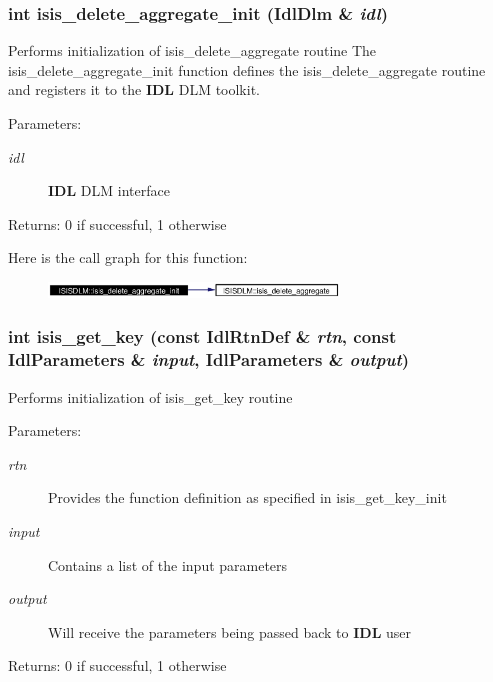 \subsubsection{\setlength{\rightskip}{0pt plus 5cm}int isis\_\-delete\_\-aggregate\_\-init (Idl\-Dlm \& {\em idl})}\label{namespaceISISDLM_a15}


Performs initialization of isis\_\-delete\_\-aggregate routine The isis\_\-delete\_\-aggregate\_\-init function defines the isis\_\-delete\_\-aggregate routine and registers it to the {\bf IDL} DLM toolkit. \begin{Desc}
\item[Parameters:]
\begin{description}
\item[{\em idl}]{\bf IDL} DLM interface \end{description}
\end{Desc}
\begin{Desc}
\item[Returns:]0 if successful, 1 otherwise \end{Desc}


Here is the call graph for this function:\begin{figure}[H]
\begin{center}
\leavevmode
\includegraphics[width=219pt]{namespaceISISDLM_a15_cgraph}
\end{center}
\end{figure}
\subsubsection{\setlength{\rightskip}{0pt plus 5cm}int isis\_\-get\_\-key (const Idl\-Rtn\-Def \& {\em rtn}, const Idl\-Parameters \& {\em input}, Idl\-Parameters \& {\em output})}\label{namespaceISISDLM_a18}


Performs initialization of isis\_\-get\_\-key routine \begin{Desc}
\item[Parameters:]
\begin{description}
\item[{\em rtn}]Provides the function definition as specified in isis\_\-get\_\-key\_\-init \item[{\em input}]Contains a list of the input parameters \item[{\em output}]Will receive the parameters being passed back to {\bf IDL} user \end{description}
\end{Desc}
\begin{Desc}
\item[Returns:]0 if successful, 1 otherwise \end{Desc}


